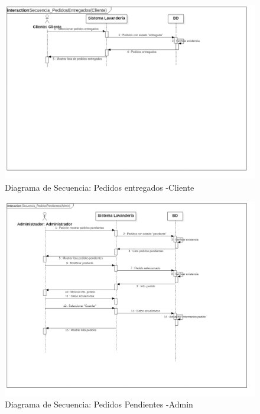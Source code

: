\begin{figure}[htb]
\begin{center}
\includegraphics[width=14cm]{./imagenes/diagramas/Secuencia_PedidosEntregados(Cliente).png}
\end{center}
\caption{Diagrama de Secuencia: Pedidos entregados -Cliente}
\end{figure}
\newpage

\begin{figure}[htb]
\begin{center}
\includegraphics[width=15cm]{./imagenes/diagramas/Secuencia_PedidosPendientes(Admin).png}
\end{center}
\caption{Diagrama de Secuencia: Pedidos Pendientes -Admin }
\end{figure}
\newpage

